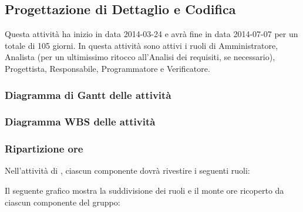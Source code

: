 \subsection{Progettazione di Dettaglio e Codifica}
Questa attività ha inizio in data 2014-03-24 e avrà fine in data 2014-07-07 per un totale di 105 giorni. In questa attività sono attivi i ruoli di Amministratore, Analista (per un ultimissimo ritocco all'Analisi dei requisiti, se necessario), Progettista, Responsabile, Programmatore e Verificatore.

\subsubsection{Diagramma di Gantt delle attività}

\newpage
\subsubsection{Diagramma WBS delle attività}

\newpage
\subsubsection{Ripartizione ore}

\newpage
Nell'attività di , ciascun componente dovrà rivestire i seguenti ruoli:

Il seguente grafico mostra la suddivisione dei ruoli e il monte ore ricoperto da ciascun componente del gruppo:
